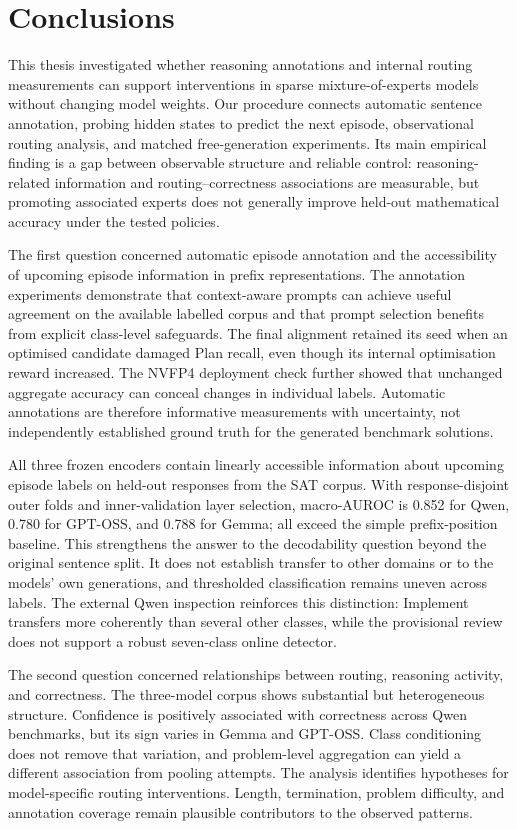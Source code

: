 \documentclass[12pt,a4paper,twoside,openright]{book}
\begin{document}
\chapter{Conclusions}
\label{ch:conclusions}

This thesis investigated whether reasoning annotations and internal routing
measurements can support interventions in sparse mixture-of-experts models
without changing model weights. Our procedure connects automatic
sentence annotation, probing hidden states to predict the next episode,
observational routing analysis, and matched free-generation experiments. Its
main empirical finding is a gap between observable structure and reliable control:
reasoning-related information and routing--correctness associations are
measurable, but promoting associated experts does not generally improve
held-out mathematical accuracy under the tested policies.

The first question concerned automatic episode annotation and the
accessibility of upcoming episode information in prefix representations.
The annotation experiments demonstrate that context-aware prompts can
achieve useful agreement on the available labelled corpus and that prompt
selection benefits from explicit class-level safeguards. The final alignment
retained its seed when an optimised candidate damaged Plan recall, even
though its internal optimisation reward increased. The NVFP4 deployment
check further showed that unchanged aggregate accuracy can conceal changes
in individual labels. Automatic annotations are therefore informative
measurements with uncertainty, not independently established ground truth
for the generated benchmark solutions.

All three frozen encoders contain linearly accessible information about
upcoming episode labels on held-out responses from the SAT corpus. With
response-disjoint outer folds and inner-validation layer selection,
macro-AUROC is 0.852 for Qwen, 0.780 for GPT-OSS, and 0.788 for Gemma;
all exceed the simple prefix-position baseline. This strengthens the
answer to the decodability question beyond the original sentence split.
It does not establish transfer to other domains or to the models' own
generations, and thresholded classification remains uneven across labels.
The external Qwen inspection reinforces this distinction: Implement
transfers more coherently than several other classes, while the provisional
review does not support a robust seven-class online detector.

The second question concerned relationships between routing, reasoning
activity, and correctness. The three-model corpus shows substantial but
heterogeneous structure. Confidence is positively associated with correctness
across Qwen benchmarks, but its sign varies in Gemma and GPT-OSS. Class
conditioning does not remove that variation, and problem-level aggregation can
yield a different association from pooling attempts. The analysis identifies
hypotheses for model-specific routing interventions. Length, termination,
problem difficulty, and annotation coverage remain plausible contributors to
the observed patterns.
\end{document}
